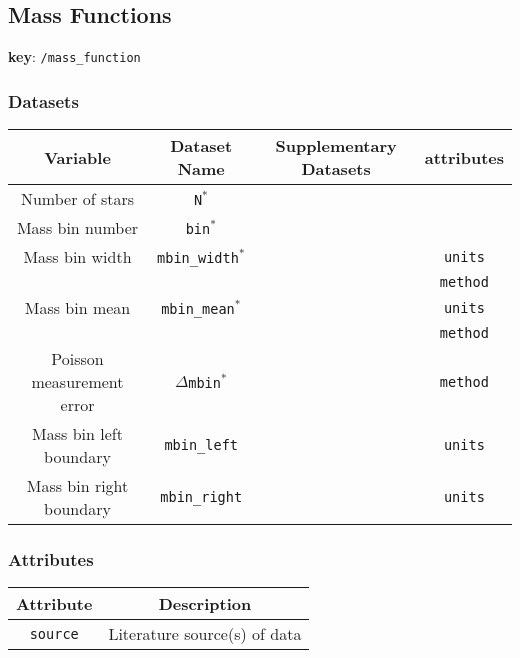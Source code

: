 \subsection{Mass Functions}

\textbf{key}: \texttt{/mass\_function}

\subsubsection{Datasets}

\begin{center}
\begin{tabular}{ | c | c | c | c | }
    \hline
    Variable & Dataset Name & Supplementary Datasets &  attributes \\
    \hline\hline
    Number of stars & \texttt{N\(^*\)} & & \\
    \hline
    Mass bin number & \texttt{bin\(^*\)} & & \\
    \hline
    Mass bin width & \texttt{mbin\_width\(^*\)} & &
    \texttt{units}\\ &&& \texttt{method} \\
    \hline
    Mass bin mean & \texttt{mbin\_mean\(^*\)} & &
    \texttt{units}\\ &&& \texttt{method} \\
    \hline
    Poisson measurement error & \texttt{\(\Delta\)mbin\(^*\)} & & \texttt{method} \\
    \hline
    Mass bin left boundary & \texttt{mbin\_left} & & \texttt{units}\\
    \hline
    Mass bin right boundary & \texttt{mbin\_right} & & \texttt{units}\\
    \hline
\end{tabular}
\end{center}

\subsubsection{Attributes}


\begin{center}
\begin{tabular}{ | c | c | }
    \hline
    Attribute & Description \\
    \hline\hline
    \texttt{source} & Literature source(s) of data \\
    \hline
\end{tabular}
\end{center}

